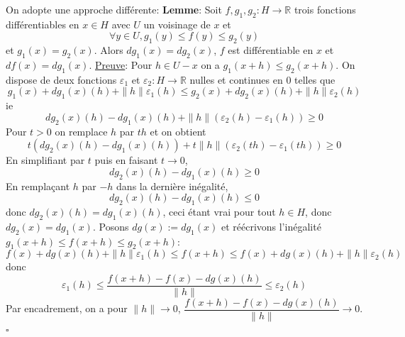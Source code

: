 \documentclass{report}
\begin{document}
\newline
On adopte une approche différente:\newline
\textbf{Lemme}: Soit $f,g_1,g_2:H\to \mathbb R$ trois fonctions différentiables en $x\in H$ avec $U$ un voisinage de $x$ et  $$\forall y\in U, g_1(y)\leq f(y)\leq g_2(y)$$ et $g_1(x)=g_2(x)$. \newline  Alors $dg_1(x)=dg_2(x)$, $f$ est différentiable en $x$ et $df(x)=dg_1(x)$.\newline \newline
\underline{Preuve}: Pour $h\in U-x$ on a $g_1(x+h)\leq g_2(x+h)$. On dispose de deux fonctions $\varepsilon_1$ et $\varepsilon_2:H\to \mathbb R$ nulles et continues en $0$ telles que $$g_1(x)+dg_1(x)(h)+\|h\|\varepsilon_1(h)\leq g_2(x)+dg_2(x)(h)+\|h\|\varepsilon_2(h)$$
ie $$dg_2(x)(h) -dg_1(x)(h) + \|h\|(\varepsilon_2(h) -\varepsilon_1(h)) \geq 0$$
Pour $t>0$ on remplace $h$ par $th$ et on obtient 
$$t(dg_2(x)(h) -dg_1(x)(h)) + t\|h\|(\varepsilon_2(th) -\varepsilon_1(th)) \geq 0$$
En simplifiant par $t$ puis en faisant $t\to 0$,
$$dg_2(x)(h) -dg_1(x)(h) \geq 0$$
En remplaçant $h$ par $-h$ dans la dernière inégalité,
$$dg_2(x)(h) -dg_1(x)(h) \leq 0$$
donc $dg_2(x)(h) =dg_1(x)(h)$, ceci étant vrai pour tout $h\in H$, donc $dg_2(x)=dg_1(x)$.\newline \newline
Posons $dg(x):=dg_1(x)$ et réécrivons l'inégalité $g_1(x+h)\leq f(x+h)\leq g_2(x+h)$:
$$f(x)+dg(x)(h)+\|h\|\varepsilon_1(h) \leq f(x+h) \leq f(x)+dg(x)(h)+\|h\|\varepsilon_2(h)$$ 
donc 
$$ \varepsilon_1(h)\leq \frac{f(x+h)-f(x)-dg(x)(h)}{\|h\|}\leq \varepsilon_2(h)$$
Par encadrement, on a pour $\|h\|\to 0$, $\dfrac{f(x+h)-f(x)-dg(x)(h)}{\|h\|}\to 0 $. \newline
\null \hfill $\square$\\
\end{document}
